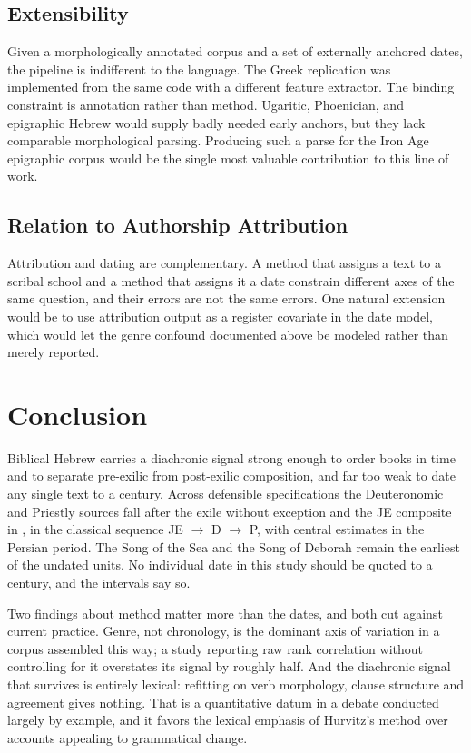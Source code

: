 \documentclass[10pt,letterpaper]{article}
\begin{document}
\subsection*{Extensibility}

Given a morphologically annotated corpus and a set of externally anchored dates,
the pipeline is indifferent to the language.  The Greek replication was
implemented from the same code with a different feature extractor.  The binding
constraint is annotation rather than method.  Ugaritic, Phoenician, and
epigraphic Hebrew would supply badly needed early anchors, but they lack
comparable morphological parsing.  Producing such a parse for the Iron Age
epigraphic corpus would be the single most valuable contribution to this line of
work.

\subsection*{Relation to Authorship Attribution}

Attribution and dating are complementary.  A method that assigns a text to a
scribal school and a method that assigns it a date constrain different axes of
the same question, and their errors are not the same errors.  One natural
extension would be to use attribution output as a register covariate in the date
model, which would let the genre confound documented above be modeled rather
than merely reported.

\section*{Conclusion}

Biblical Hebrew carries a diachronic signal strong enough to order books in
time and to separate pre-exilic from post-exilic composition, and far too weak
to date any single text to a century.  Across \SPpass{} defensible
specifications the Deuteronomic and Priestly sources fall after the exile
without exception and the JE composite in \SPJEpost, in the classical sequence
JE $\rightarrow$ D $\rightarrow$ P, with central estimates in the Persian
period.  The Song of the Sea and the Song of Deborah remain the earliest of the
\NTargets{} undated units.  No individual date in this study should be quoted
to a century, and the intervals say so.

Two findings about method matter more than the dates, and both cut against
current practice.  Genre, not chronology, is the dominant axis of variation in a
corpus assembled this way; a study reporting raw rank correlation without
controlling for it overstates its signal by roughly half.  And the diachronic
signal that survives is entirely lexical: refitting on verb morphology, clause
structure and agreement gives nothing.  That is a quantitative datum in a debate
conducted largely by example, and it favors the lexical emphasis of Hurvitz's
method over accounts appealing to grammatical change.
\end{document}
